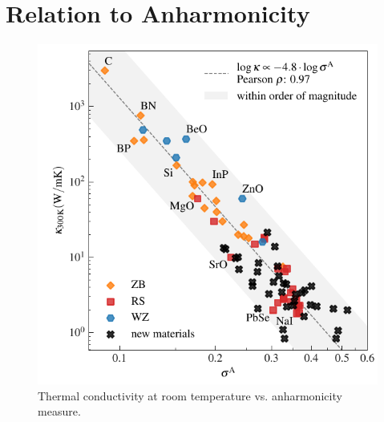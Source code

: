 \section{Relation to Anharmonicity}

\begin{figure}
	\includegraphics[width=\textwidth]{./data/plots/anharmonicity/9_kappa/incl_computations/sigma_vs_kappa_annot_comp.pdf}
	\caption{Thermal conductivity at room temperature vs. anharmonicity measure.}
	\label{fig:kappa_sigma_exp_comp}
\end{figure}

